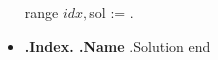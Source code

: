 \documentclass[a4paper,11pt]{article}
\begin{document}
\begin{flushleft}
\begin{multicols}{2}
\begin{itemize}
\setlength\itemsep{-1pt}
{{range $idx, $sol := .}}
  \item[]\textbf{ {{.Index}}. {{.Name}} } {{.Solution}}
{{end}}
\end{itemize}  
\end{multicols}
\end{flushleft}
\end{document}
